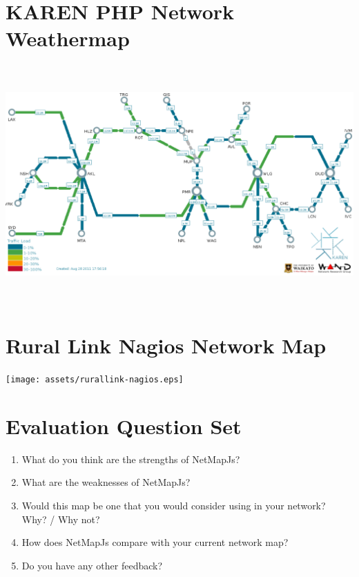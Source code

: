 \documentclass[11pt, a4paper]{article}
\begin{document}
\section{KAREN PHP Network Weathermap}
\label{app:karenphp}
\centering
\includegraphics[width=170mm,height=90.76mm]{assets/karen-phpweathermap.eps}

\newpage

\section{Rural Link Nagios Network Map}
\label{app:crcnetnagios}
\centering
\texttt{[image: assets/rurallink-nagios.eps]}

\newpage

\section{Evaluation Question Set}
\label{app:evaluation-questions}

\begin{enumerate}
\item What do you think are the strengths of NetMapJs?
\item What are the weaknesses of NetMapJs?
\item Would this map be one that you would consider using in your network? Why? / Why not?
\item How does NetMapJs compare with your current network map?
\item Do you have any other feedback?
\end{enumerate}
\end{document}
